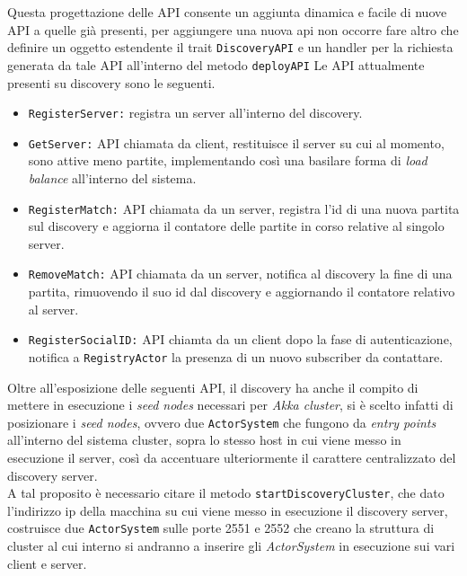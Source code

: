 Questa progettazione delle API consente un aggiunta dinamica e facile di nuove API a quelle già presenti, per aggiungere una nuova api non occorre fare altro che definire un oggetto estendente il trait \texttt{DiscoveryAPI} e un handler per la richiesta generata da tale API all'interno del metodo \texttt{deployAPI}
Le API attualmente presenti su discovery sono le seguenti.

\begin{itemize}
  \item{\texttt{RegisterServer:\/}} registra un server all'interno del discovery.

  \item{\texttt{GetServer:\/}} API chiamata da client, restituisce il server su cui al momento, sono attive meno partite, implementando così una basilare forma di \textit{load balance} all'interno del sistema.

  \item{\texttt{RegisterMatch:\/}} API chiamata da un server, registra l'id di una nuova partita sul discovery e aggiorna il contatore delle partite in corso relative al singolo server.

  \item{\texttt{RemoveMatch:\/}} API chiamata da un server, notifica al discovery la fine di una partita, rimuovendo il suo id dal discovery e aggiornando il contatore relativo al server.

  \item{\texttt{RegisterSocialID:\/}} API chiamta da un client dopo la fase di autenticazione, notifica a \texttt{RegistryActor} la presenza di un nuovo subscriber da contattare.
\end{itemize}

Oltre all'esposizione delle seguenti API, il discovery ha anche il compito di mettere in esecuzione i \textit{seed nodes} necessari per \textit{Akka cluster}, si è scelto infatti di posizionare i \textit{seed nodes}, ovvero due \texttt{ActorSystem} che fungono da \textit{entry points} all'interno del sistema cluster, sopra lo stesso host in cui viene messo in esecuzione il server, così da accentuare ulteriormente il carattere centralizzato del discovery server.\\
 A tal proposito è necessario citare il metodo \texttt{startDiscoveryCluster}, che dato l'indirizzo ip della macchina su cui viene messo in esecuzione il discovery server, costruisce due \texttt{ActorSystem} sulle porte 2551 e 2552 che creano la struttura di cluster al cui interno si andranno a inserire gli \textit{ActorSystem} in esecuzione sui vari client e server.


